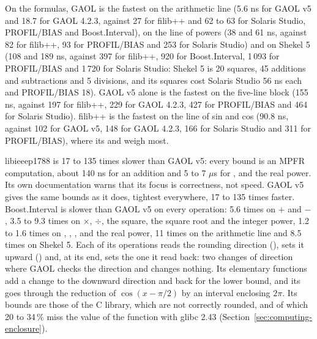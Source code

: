 \documentclass[12pt,a4paper,twoside,openright]{book}
\begin{document}
\medskip
On the formulas, GAOL is the fastest on the arithmetic line (5.6 ns for GAOL
v5 and 18.7 for GAOL 4.2.3, against 27 for filib++ and 62 to 63 for Solaris
Studio, PROFIL/BIAS and Boost.Interval), on the line of powers (38 and
61 ns, against 82 for filib++, 93 for PROFIL/BIAS and 253 for Solaris
Studio) and on Shekel 5 (108 and 189 ns, against 397 for filib++, 920 for
Boost.Interval, 1\,093 for PROFIL/BIAS and 1\,720 for Solaris Studio: Shekel
5 is 20 squares, 45 additions and subtractions and 5 divisions, and its
squares cost Solaris Studio 56 ns each and PROFIL/BIAS 18). GAOL v5 alone is
the fastest on the five-line block (155 ns, against 197 for filib++, 229 for
GAOL 4.2.3, 427 for PROFIL/BIAS and 464 for Solaris Studio). filib++ is the
fastest on the line of sin and cos (90.8 ns, against 102 for GAOL v5, 148
for GAOL 4.2.3, 166 for Solaris Studio and 311 for PROFIL/BIAS), where its
 and  weigh most.

\medskip
libieeep1788 is 17 to 135 times slower than GAOL v5: every bound is an MPFR
computation, about 140 ns for an addition and 5 to 7 $\mu$s for ,
 and the real power. Its own documentation warns that its focus is
correctness, not speed. GAOL v5 gives the same bounds as it does, tightest
everywhere, 17 to 135 times faster. Boost.Interval is slower than GAOL v5 on
every operation: 5.6 times on $+$ and $-$, 3.5 to 9.3 times on $\times$,
$\div$, the square, the square root and the integer power, 1.2 to 1.6 times
on , , ,  and the real power, 11
times on the arithmetic line and 8.5 times on Shekel 5. Each of its
operations reads the rounding direction (), sets it upward
() and, at its end, sets the one it read back: two changes
of direction where GAOL checks the direction and changes nothing. Its
elementary functions add a change to the downward direction and back for the
lower bound, and its  goes through the reduction of
$\cos(x - \pi/2)$ by an interval enclosing $2\pi$. Its bounds are those of
the C library, which are not correctly rounded, and of which 20 to 34\,\%
miss the value of the function with glibc 2.43
(Section~\ref{sec:computing-enclosure}).
\end{document}
